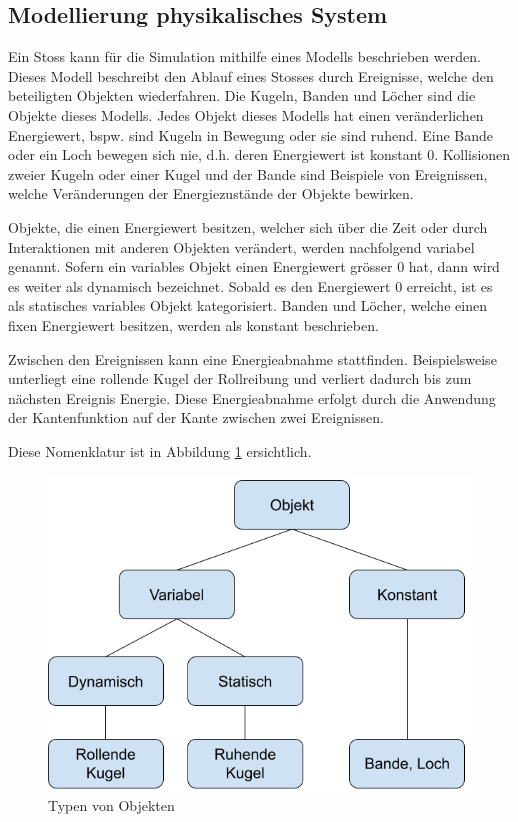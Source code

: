\newpage
\subsection{Modellierung physikalisches System}\label{kap:physikalisches_system}
Ein Stoss kann für die Simulation mithilfe eines Modells beschrieben werden.
Dieses Modell beschreibt den Ablauf eines Stosses durch Ereignisse, welche den beteiligten Objekten wiederfahren.
Die Kugeln, Banden und Löcher sind die Objekte dieses Modells.
Jedes Objekt dieses Modells hat einen veränderlichen Energiewert, bspw. sind Kugeln in Bewegung oder sie sind ruhend.
Eine Bande oder ein Loch bewegen sich nie, d.h. deren Energiewert ist konstant 0.
Kollisionen zweier Kugeln oder einer Kugel und der Bande sind Beispiele von Ereignissen, welche Veränderungen
der Energiezustände der Objekte bewirken.

Objekte, die einen Energiewert besitzen, welcher sich über die Zeit oder durch Interaktionen mit anderen Objekten verändert,
werden nachfolgend variabel genannt. Sofern ein variables Objekt einen Energiewert grösser 0 hat,
dann wird es weiter als dynamisch bezeichnet. Sobald es den Energiewert 0 erreicht, ist es als statisches
variables Objekt kategorisiert.
Banden und Löcher, welche einen fixen Energiewert besitzen, werden als konstant beschrieben.

Zwischen den Ereignissen kann eine Energieabnahme stattfinden. Beispielsweise unterliegt eine rollende Kugel der
Rollreibung und verliert dadurch bis zum nächsten Ereignis Energie.
Diese Energieabnahme erfolgt durch die Anwendung der Kantenfunktion auf der Kante zwischen zwei Ereignissen.

Diese Nomenklatur ist in Abbildung \ref{fig:physical_model_object_categories} ersichtlich.

\begin{figure}[h!]
    \begin{center}
        \includegraphics[width=0.5\linewidth]{../common/03_billiard_ai/resources/17_physical_model_categories.png}
    \end{center}
    \caption{Typen von Objekten}
    \label{fig:physical_model_object_categories}
\end{figure}

